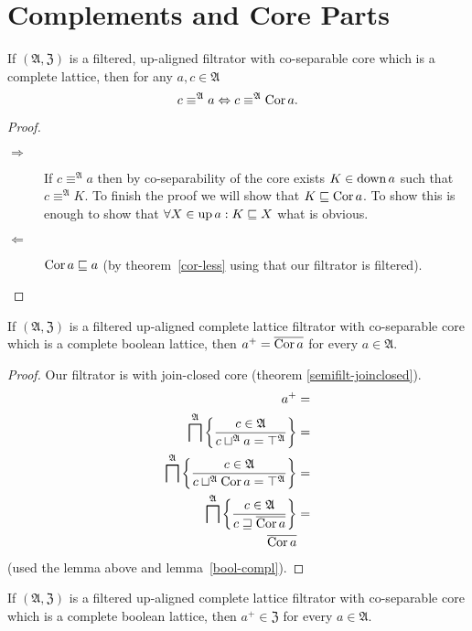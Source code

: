 \section{Complements and Core Parts}
\begin{lem}
If $(\mathfrak{A},\mathfrak{Z})$ is a filtered, up-aligned filtrator
with co-separable core which is a complete lattice, then for any $a,c\in\mathfrak{A}$
\[
c\equiv^{\mathfrak{A}}a\Leftrightarrow c\equiv^{\mathfrak{A}}\operatorname{Cor} a.
\]
\end{lem}
\begin{proof}
~
\begin{description}
\item [{$\Rightarrow$}] If $c\equiv^{\mathfrak{A}}a$ then by co-separability
of the core exists $K\in\operatorname{down} a$ such that $c\equiv^{\mathfrak{A}}K$.
To finish the proof we will show that $K\sqsubseteq\operatorname{Cor} a$. To show
this is enough to show that $\forall X\in\operatorname{up} a:K\sqsubseteq X$ what
is obvious.
\item [{$\Leftarrow$}] $\operatorname{Cor} a\sqsubseteq a$ (by theorem~\ref{cor-less}
using that our filtrator is filtered).
\end{description}
\end{proof}
\begin{thm}
\label{cocompl-cor}If $(\mathfrak{A},\mathfrak{Z})$ is a filtered
up-aligned complete lattice filtrator with co-separable core which
is a complete boolean lattice, then $a^{+}=\overline{\operatorname{Cor} a}$ for
every $a\in\mathfrak{A}$.\end{thm}
\begin{proof}
Our filtrator is with join-closed core (theorem \ref{semifilt-joinclosed}).
\begin{align*}
a^{+} & =\\
\bigsqcap^{\mathfrak{A}}\left\{ \frac{c\in\mathfrak{A}}{c\sqcup^{\mathfrak{A}}a=\top^{\mathfrak{A}}}\right\} & =\\
\bigsqcap^{\mathfrak{A}}\left\{ \frac{c\in\mathfrak{A}}{c\sqcup^{\mathfrak{A}}\operatorname{Cor} a=\top^{\mathfrak{A}}}\right\} & =\\
\bigsqcap^{\mathfrak{A}}\left\{ \frac{c\in\mathfrak{A}}{c\sqsupseteq\overline{\operatorname{Cor} a}}\right\} & =\\
\overline{\operatorname{Cor} a}
\end{align*}
(used the lemma above and lemma~\ref{bool-compl}).\end{proof}
\begin{cor}
If $(\mathfrak{A},\mathfrak{Z})$ is a filtered up-aligned complete
lattice filtrator with co-separable core which is a complete boolean
lattice, then $a^{+}\in\mathfrak{Z}$ for every $a\in\mathfrak{A}$.\end{cor}
